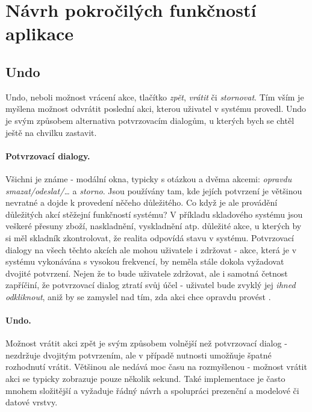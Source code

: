 \section{Návrh pokročilých funkčností aplikace}

\subsection{Undo}\label{draft:undo}

Undo, neboli možnost vrácení akce, tlačítko \emph{zpět}, \emph{vrátit} či \emph{stornovat}. Tím vším je myšlena možnost odvrátit poslední akci, kterou uživatel v systému provedl. Undo je svým způsobem alternativa potvrzovacím dialogům, u kterých bych se chtěl ještě na chvilku zastavit.

\paragraph{Potvrzovací dialogy.} Všichni je známe - modální okna, typicky s otázkou a dvěma akcemi: \emph{opravdu smazat/odeslat/\ldots} a \emph{storno}. Jsou používány tam, kde jejích potvrzení je většinou nevratné a dojde k provedení něčeho důležitého. Co když je ale provádění důležitých akcí stěžejní funkčností systému? V příkladu skladového systému jsou veškeré přesuny zboží, naskladnění, vyskladnění atp. důležité akce, u kterých by si měl skladník zkontrolovat, že realita odpovídá stavu v systému. Potvrzovací dialogy na všech těchto akcích ale mohou uživatele i zdržovat - akce, která je v systému vykonávána s vysokou frekvencí, by neměla stále dokola vyžadovat dvojité potvrzení. Nejen že to bude uživatele zdržovat, ale i samotná četnost zapříčiní, že potvrzovací dialog ztratí svůj účel - uživatel bude zvyklý jej \emph{ihned odkliknout}, aniž by se zamyslel nad tím, zda akci chce opravdu provést \cite{nn-dialogs}. 

\paragraph{Undo.} Možnost vrátit akci zpět je svým způsobem volnější než potvrzovací dialog - nezdržuje dvojitým potvrzením, ale v případě nutnosti umožňuje špatné rozhodnutí vrátit. Většinou ale nedává moc času na rozmyšlenou - možnost vrátit akci se typicky zobrazuje pouze několik sekund. Také implementace je často mnohem složitější a vyžaduje řádný návrh a spolupráci prezenční a modelové či datové vrstvy.

